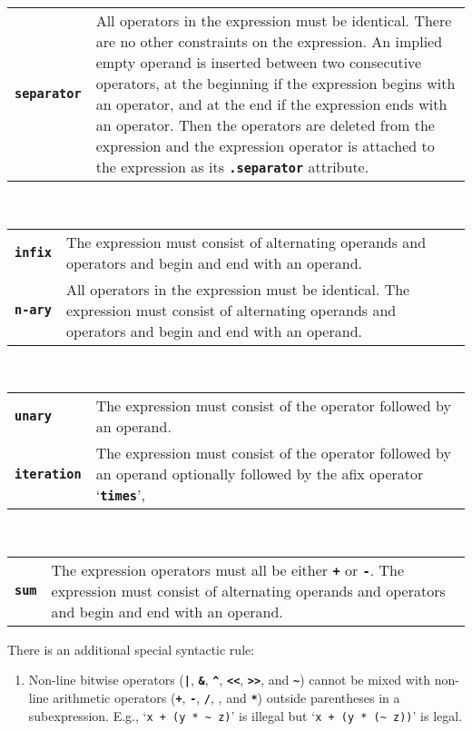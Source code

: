 \documentclass[12pt]{article}
\newcommand{\TT}[1]{{\tt \bfseries #1}}
\newcommand{\ttkey}[1]{{\tt \bfseries #1}}
\begin{document}
\begin{center}
\begin{tabular}{p{1in}p{5.0in}}
\ttkey{separator}\label{SEPARATOR-FORMAT}
    & All operators in the expression must be identical.
      There are no other constraints on the expression.  An implied empty
      operand is inserted between two consecutive operators,
      at the beginning if the expression begins with an operator,
      and at the end if the expression ends with an operator.
      Then the operators are deleted from the expression and
      the expression operator is attached
      to the expression as its \TT{.separator} attribute.
\end{tabular}
\\[0.5ex]
\begin{tabular}{p{1in}p{5.0in}}
\ttkey{infix}
    & The expression must consist of alternating operands
      and operators and begin and end with an operand.
\\[1ex]
\ttkey{n-ary}
    & All operators in the expression must be identical.
      The expression must consist of alternating operands
      and operators and begin and end with an operand.
\end{tabular}
\\[0.5ex]
\begin{tabular}{p{1in}p{5.0in}}
\ttkey{unary}
    & The expression must consist of
      the operator followed by an operand.
\\[1ex]
\ttkey{iteration}
    & The expression must consist of
      the operator followed by an operand optionally followed
      by the afix operator `\TT{times}',
\end{tabular}
\\[0.5ex]
\begin{tabular}{p{1in}p{5.0in}}
\ttkey{sum}
    & The expression operators must all be either \TT{+} or \TT{-}.
      The expression must consist of alternating operands
      and operators and begin and end with an operand.
\end{tabular}
\end{center}

There is an additional special syntactic rule:
\begin{enumerate}
\item Non-line bitwise operators (\TT{|}, \TT{\&}, \TT{\textasciicircum},
\TT{<{}<}, \TT{>{}>}, and \TT{\textasciitilde}) cannot be mixed
with non-line arithmetic operators
(\TT{+}, \TT{-}, \TT{/}, \TT{*}, and \TT{**})
outside parentheses in a subexpression.
E.g., `{\tt x + (y * \textasciitilde{} z)}'
is illegal but `{\tt x + (y * (\textasciitilde{} z))}' is legal.
\end{enumerate}
\end{document}

